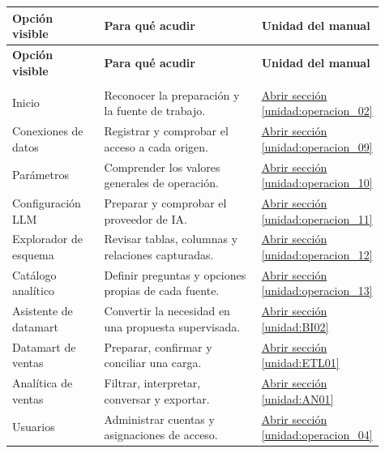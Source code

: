 \begingroup
\fontsize{10}{12.5}\selectfont
\setlength{\tabcolsep}{5pt}
\renewcommand{\arraystretch}{1.15}
\begin{longtable}{@{}>{\RaggedRight\arraybackslash}p{0.25\linewidth}>{\RaggedRight\arraybackslash}p{0.44\linewidth}>{\RaggedRight\arraybackslash}p{0.22\linewidth}@{}}
\toprule
\textbf{Opción visible} & \textbf{Para qué acudir} & \textbf{Unidad del manual} \\
\midrule
\endfirsthead
\toprule
\textbf{Opción visible} & \textbf{Para qué acudir} & \textbf{Unidad del manual} \\
\midrule
\endhead
\midrule
\multicolumn{3}{r}{\footnotesize Continúa en la página siguiente}\\
\endfoot
\bottomrule
\endlastfoot
Inicio & Reconocer la preparación y la fuente de trabajo. & \hyperref[unidad:operacion_02]{Abrir sección \ref*{unidad:operacion_02}} \\
\addlinespace[3pt]
Conexiones de datos & Registrar y comprobar el acceso a cada origen. & \hyperref[unidad:operacion_09]{Abrir sección \ref*{unidad:operacion_09}} \\
\addlinespace[3pt]
Parámetros & Comprender los valores generales de operación. & \hyperref[unidad:operacion_10]{Abrir sección \ref*{unidad:operacion_10}} \\
\addlinespace[3pt]
Configuración LLM & Preparar y comprobar el proveedor de IA. & \hyperref[unidad:operacion_11]{Abrir sección \ref*{unidad:operacion_11}} \\
\addlinespace[3pt]
Explorador de esquema & Revisar tablas, columnas y relaciones capturadas. & \hyperref[unidad:operacion_12]{Abrir sección \ref*{unidad:operacion_12}} \\
\addlinespace[3pt]
Catálogo analítico & Definir preguntas y opciones propias de cada fuente. & \hyperref[unidad:operacion_13]{Abrir sección \ref*{unidad:operacion_13}} \\
\addlinespace[3pt]
Asistente de datamart & Convertir la necesidad en una propuesta supervisada. & \hyperref[unidad:BI02]{Abrir sección \ref*{unidad:BI02}} \\
\addlinespace[3pt]
Datamart de ventas & Preparar, confirmar y conciliar una carga. & \hyperref[unidad:ETL01]{Abrir sección \ref*{unidad:ETL01}} \\
\addlinespace[3pt]
Analítica de ventas & Filtrar, interpretar, conversar y exportar. & \hyperref[unidad:AN01]{Abrir sección \ref*{unidad:AN01}} \\
\addlinespace[3pt]
Usuarios & Administrar cuentas y asignaciones de acceso. & \hyperref[unidad:operacion_04]{Abrir sección \ref*{unidad:operacion_04}} \\

\end{longtable}
